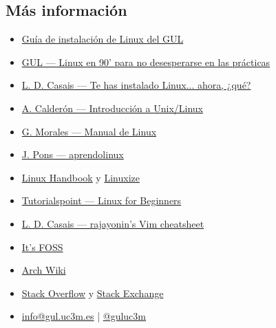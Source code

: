 \documentclass[aspectratio=43]{beamer}
\begin{document}
    \subsection{Más información}
     \begin{frame}{\subsecname}{}
        \begin{itemize}
            \item \href{https://github.com/guluc3m/linux404}{Guía de instalación de Linux del GUL}
            \item \href{https://youtu.be/2qZBUa93MQ8}{GUL — Linux en 90' para no desesperarse en las prácticas}
            \item \href{https://youtu.be/XpQujpVKliA?si=BLPIhepjnb4vW0sw}{L. D. Casais — Te has instalado Linux... ahora, ¿qué?}
            \item \href{https://github.com/acaldero/uc3m_linux}{A. Calderón — Introducción a Unix/Linux}
            \item \href{https://github.com/gmorales08/ManualLinux/blob/master/MANUAL_LINUX}{G. Morales — Manual de Linux}
            \item \href{https://aprendolinux.com}{J. Pons — aprendolinux}
            \item \href{https://linuxhandbook.com/}{Linux Handbook} y \href{https://linuxize.com/}{Linuxize}
            \item \href{https://www.tutorialspoint.com/unix/index.htm}{Tutorialspoint — Linux for Beginners}
            \item \href{https://github.com/rajayonin/cheatsheets/blob/main/vim_cheatsheet.md}{L. D. Casais — rajayonin's Vim cheatsheet}
            \item \href{https://itsfoss.com/}{It's FOSS}
            \item \href{https://wiki.archlinux.org/}{Arch Wiki}
            \item \href{https://stackoverflow.com/}{Stack Overflow} y \href{https://stackoverflow.com/}{Stack Exchange}
            \item \href{mailto:info@gul.uc3m.es}{info@gul.uc3m.es} | \href{https://twitter.com/guluc3m}{@guluc3m}
        \end{itemize}
    \end{frame}
\end{document}
